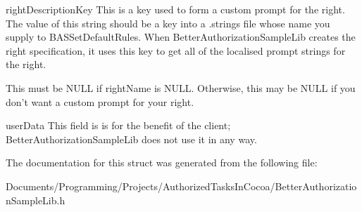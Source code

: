 rightDescriptionKey This is a key used to form a custom prompt for the right. The value of this string should be a key into a .strings file whose name you supply to BASSetDefaultRules. When BetterAuthorizationSampleLib creates the right specification, it uses this key to get all of the localised prompt strings for the right.

This must be NULL if rightName is NULL. Otherwise, this may be NULL if you don't want a custom prompt for your right.

userData This field is is for the benefit of the client; BetterAuthorizationSampleLib does not use it in any way. 

The documentation for this struct was generated from the following file:\begin{CompactItemize}
\item 
Documents/Programming/Projects/AuthorizedTasksInCocoa/BetterAuthorizationSampleLib.h\end{CompactItemize}
